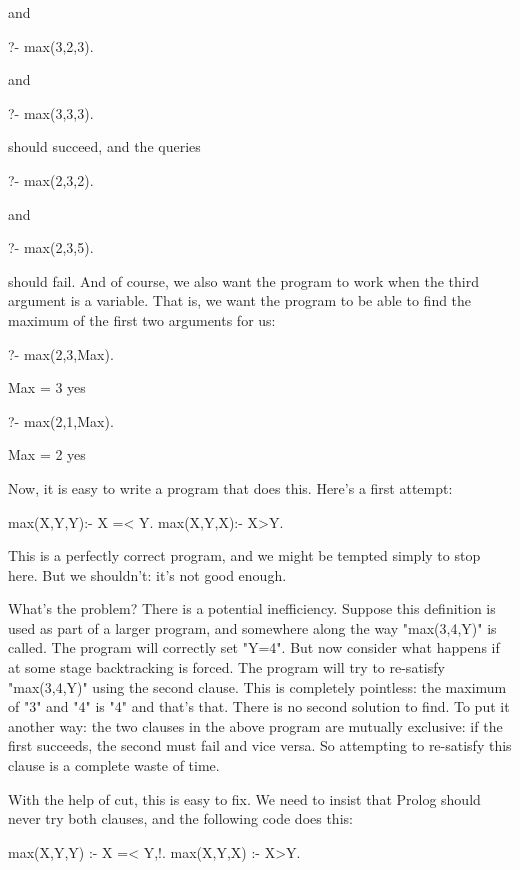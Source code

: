 and
\begin{LPNcodedisplay}
?- max(3,2,3).
\end{LPNcodedisplay}

and
\begin{LPNcodedisplay}
?- max(3,3,3).
\end{LPNcodedisplay}

should succeed,
and the queries
\begin{LPNcodedisplay}
?- max(2,3,2).
\end{LPNcodedisplay}

and
\begin{LPNcodedisplay}
?- max(2,3,5).
\end{LPNcodedisplay}
should fail. And of course, we also want the program to work when the
third argument is a variable.  That is, we want the program to be able
to find the maximum of the first two arguments for us:
\begin{LPNcodedisplay}
?- max(2,3,Max).

Max = 3
yes

?- max(2,1,Max).

Max = 2
yes
\end{LPNcodedisplay}



Now, it is easy to write a program that does this. Here's
a first attempt:
\begin{LPNcodedisplay}
max(X,Y,Y):- X =< Y.
max(X,Y,X):- X>Y.
\end{LPNcodedisplay}
This is a perfectly correct program, and we might be tempted
simply to stop here. But we shouldn't: it's not good enough.

What's the problem? There is a potential inefficiency.  Suppose this
definition is used as part of a larger program, and somewhere along
the way "max(3,4,Y)" is called.  The program will correctly set "Y=4".
But now consider what happens if at some stage backtracking is forced.
The program will try to re-satisfy "max(3,4,Y)" using the second
clause. This is completely pointless: the maximum of "3" and "4" is
"4" and that's that. There is no second solution to find.  To put it
another way: the two clauses in the above program are mutually
exclusive: if the first succeeds, the second must fail and vice versa.
So attempting to re-satisfy this clause is a complete waste of time.

With the help of cut, this is easy to fix. We need to insist that
Prolog should never try both clauses, and the following code does
this:
\begin{LPNcodedisplay}
max(X,Y,Y) :- X =< Y,!.
max(X,Y,X) :- X>Y.
\end{LPNcodedisplay}

